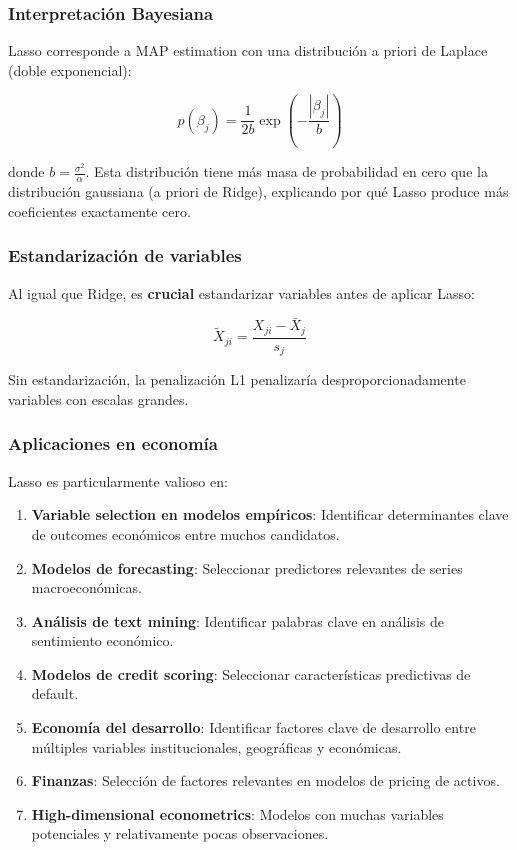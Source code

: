 \documentclass[
  doc,
  floatsintext,
  longtable,
  a4paper,
  nolmodern,
  notxfonts,
  notimes,
  12pt,
  colorlinks=true,linkcolor=blue,citecolor=blue,urlcolor=blue]{apa7}
\begin{document}
\subsubsection{Interpretación
Bayesiana}\label{interpretaciuxf3n-bayesiana-1}

Lasso corresponde a MAP estimation con una distribución a priori de
Laplace (doble exponencial):

\[
p(\beta_j) = \frac{1}{2b} \exp\left(-\frac{|\beta_j|}{b}\right)
\]

donde \(b = \frac{\sigma^2}{\alpha}\). Esta distribución tiene más masa
de probabilidad en cero que la distribución gaussiana (a priori de
Ridge), explicando por qué Lasso produce más coeficientes exactamente
cero.

\subsubsection{Estandarización de
variables}\label{estandarizaciuxf3n-de-variables-1}

Al igual que Ridge, es \textbf{crucial} estandarizar variables antes de
aplicar Lasso:

\[
\tilde{X}_{ji} = \frac{X_{ji} - \bar{X}_j}{s_j}
\]

Sin estandarización, la penalización L1 penalizaría
desproporcionadamente variables con escalas grandes.

\subsubsection{Aplicaciones en
economía}\label{aplicaciones-en-economuxeda-2}

Lasso es particularmente valioso en:

\begin{enumerate}
\def\labelenumi{\arabic{enumi}.}
\item
  \textbf{Variable selection en modelos empíricos}: Identificar
  determinantes clave de outcomes económicos entre muchos candidatos.
\item
  \textbf{Modelos de forecasting}: Seleccionar predictores relevantes de
  series macroeconómicas.
\item
  \textbf{Análisis de text mining}: Identificar palabras clave en
  análisis de sentimiento económico.
\item
  \textbf{Modelos de credit scoring}: Seleccionar características
  predictivas de default.
\item
  \textbf{Economía del desarrollo}: Identificar factores clave de
  desarrollo entre múltiples variables institucionales, geográficas y
  económicas.
\item
  \textbf{Finanzas}: Selección de factores relevantes en modelos de
  pricing de activos.
\item
  \textbf{High-dimensional econometrics}: Modelos con muchas variables
  potenciales y relativamente pocas observaciones.
\end{enumerate}
\end{document}

